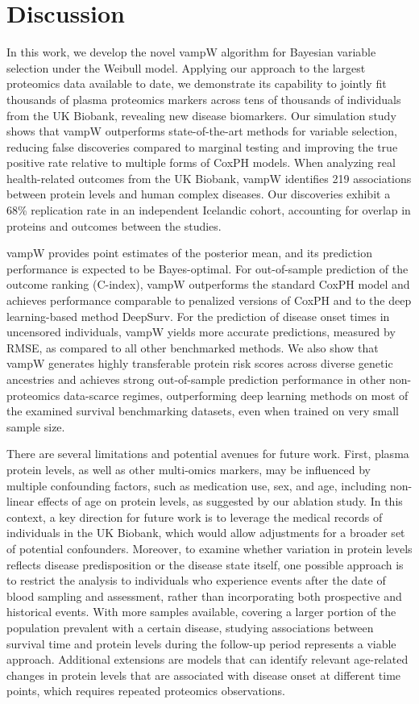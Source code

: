 \section{Discussion}
In this work, we develop the novel vampW algorithm for Bayesian variable selection under the Weibull model. Applying our approach to the largest proteomics data available to date, we demonstrate its capability to jointly fit thousands of plasma proteomics markers across tens of thousands of individuals from the UK Biobank, revealing new disease biomarkers. Our simulation study shows that vampW outperforms state-of-the-art methods for variable selection, reducing false discoveries compared to marginal testing and improving the true positive rate relative to multiple forms of CoxPH models. When analyzing real health-related outcomes from the UK Biobank, vampW identifies 219 associations between protein levels and human complex diseases. Our discoveries exhibit a 68\% replication rate in an independent Icelandic cohort, accounting for overlap in proteins and outcomes between the studies. 

vampW provides point estimates of the posterior mean, and its prediction performance is expected to be Bayes-optimal. For out-of-sample prediction of the outcome ranking (C-index), vampW outperforms the standard CoxPH model and achieves performance comparable to penalized versions of CoxPH and to the deep learning-based method DeepSurv. For the prediction of disease onset times in uncensored individuals, vampW yields more accurate predictions, measured by RMSE, as compared to all other benchmarked methods. We also show that vampW generates highly transferable protein risk scores across diverse genetic ancestries and achieves strong out-of-sample prediction performance in other non-proteomics data-scarce regimes, outperforming deep learning methods on most of the examined survival benchmarking datasets, even when trained on very small sample size. 

There are several limitations and potential avenues for future work. First, plasma protein levels, as well as other multi-omics markers, may be influenced by multiple confounding factors, such as medication use, sex, and age, including non-linear effects of age on protein levels, as suggested by our ablation study. In this context, a key direction for future work is to leverage the medical records of individuals in the UK Biobank, which would allow adjustments for a broader set of potential confounders. Moreover, to examine whether variation in protein levels reflects disease predisposition or the disease state itself, one possible approach is to restrict the analysis to individuals who experience events after the date of blood sampling and assessment, rather than incorporating both prospective and historical events. With more samples available, covering a larger portion of the population prevalent with a certain disease, studying associations between survival time and protein levels during the follow-up period represents a viable approach. Additional extensions are models that can identify relevant age-related changes in protein levels that are associated with disease onset at different time points, which requires repeated proteomics observations.


